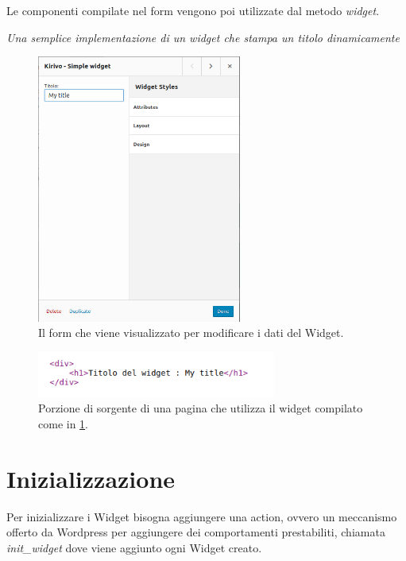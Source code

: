 Le componenti compilate nel form vengono poi utilizzate dal metodo \emph{widget}.



\emph{Una semplice implementazione di un widget che stampa un titolo dinamicamente}


\begin{figure}
  \includegraphics[width=0.6\textwidth]{figure/wid_form.png}
  \caption{Il form che viene visualizzato per modificare i dati del Widget.}
  \label{fig:wform}
\end{figure}
\begin{figure}
  \includegraphics[width=0.7\textwidth]{figure/sourcewid.png}
  \caption{Porzione di sorgente di una pagina che utilizza il widget compilato come in \ref{fig:wform}.}
  \label{fig:wsource}
\end{figure}

\newpage

\section{Inizializzazione}
Per inizializzare i Widget bisogna aggiungere una action\cite{WPACTION}, ovvero un meccanismo offerto da Wordpress per aggiungere dei comportamenti
prestabiliti,  chiamata \emph{init\_widget} dove viene aggiunto ogni Widget creato.

